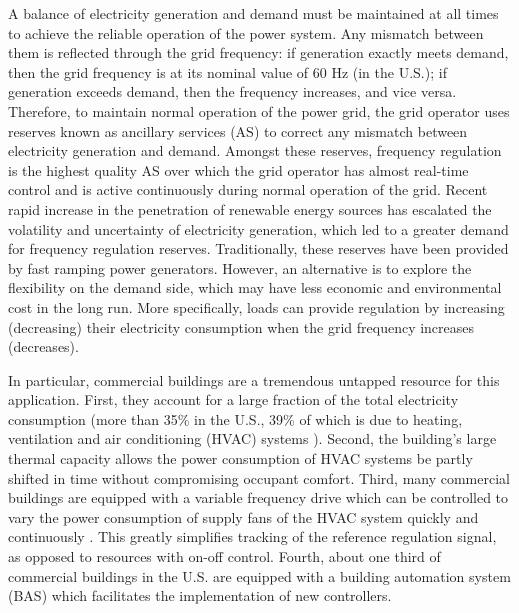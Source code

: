 \documentclass[../thesis.tex]{subfiles}
\begin{document}
A balance of electricity generation and demand must be maintained at all times to achieve the reliable operation of the power system.
Any mismatch between them is reflected through the grid frequency: if generation exactly meets demand, then the grid frequency is at its nominal value of 60 Hz (in the U.S.); if generation exceeds demand, then the frequency increases, and vice versa.
Therefore, to maintain normal operation of the power grid, the grid operator uses reserves known as ancillary services (AS) to correct any mismatch between electricity generation and demand.
Amongst these reserves, frequency regulation is the highest quality AS over which the grid operator has almost real-time control and is active continuously during normal operation of the grid.
Recent rapid increase in the penetration of renewable energy sources has escalated the volatility and uncertainty of electricity generation, which led to a greater demand for frequency regulation reserves.
Traditionally, these reserves have been provided by fast ramping power generators.
However, an alternative is to explore the flexibility on the demand side, which may have less economic and environmental cost in the long run. 
More specifically, loads can provide regulation by increasing (decreasing) their electricity consumption when the grid frequency increases (decreases).

In particular, commercial buildings are a tremendous untapped resource for this application. 
First, they account for a large fraction of the total electricity consumption (more than 35\% in the U.S., 39\% of which is due to heating, ventilation and air conditioning (HVAC) systems \cite{USenergy:2017}). 
Second, the building's large thermal capacity allows the power consumption of HVAC systems be partly shifted in time without compromising occupant comfort. 
Third, many commercial buildings are equipped with a variable frequency drive which can be controlled to vary the power consumption of supply fans of the HVAC system quickly and continuously \cite{Hao:2012demandresponse}. This greatly simplifies tracking of the reference regulation signal, as opposed to resources with on-off control.
Fourth, about one third of commercial buildings in the U.S. are equipped with a building automation system (BAS) \cite{Braun:2012} which facilitates the implementation of new controllers.
\end{document}
